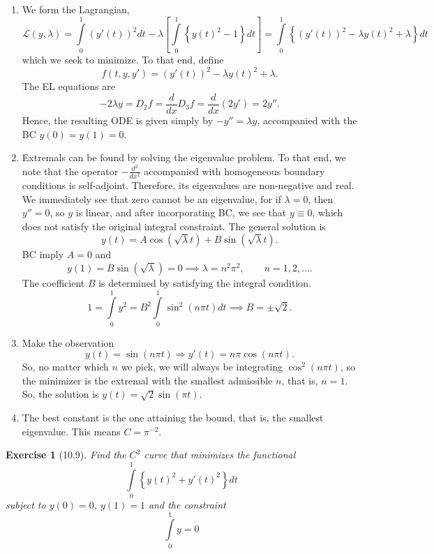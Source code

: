 \documentclass[letterpaper,twoside,11pt]{article}
\theoremstyle{mystyle}
\newtheorem*{exercise}{Exercise}
\newcommand{\cbk}{\color{black}}
\begin{document}
\begin{enumerate}
  \item We form the Lagrangian, 
  \[\mathcal{L}\left( {y,\lambda } \right) = \int\limits_0^1 {{{\left( {y'\left( t \right)} \right)}^2}dt}  - \lambda \left[ {\int\limits_0^1 {\left\{ {y{{\left( t \right)}^2} - 1} \right\}dt} } \right] = \int\limits_0^1 {\left\{ {{{\left( {y'\left( t \right)} \right)}^2} - \lambda y{{\left( t \right)}^2} + \lambda } \right\}dt} \]
  which we seek to minimize. To that end, define 
  \[f(t, y, y') = {{{\left( {y'\left( t \right)} \right)}^2} - \lambda y{{\left( t \right)}^2} + \lambda }.\]
  The EL equations are
  \[ - 2\lambda y = {D_2}f = \frac{d}{{dx}}{D_3}f = \frac{d}{{dx}}\left( {2y'} \right) = 2y''.\]
  Hence, the resulting ODE is given simply by $-y'' = \lambda y$, accompanied with the BC $y(0) = y(1) = 0$. 
  \item Extremals can be found by solving the eigenvalue problem. To that end, we note that the operator $-\frac{d^2}{dx^2}$ accompanied with homogeneous boundary conditions is self-adjoint. Therefore, its eigenvalues are non-negative and real. We immediately see that zero cannot be an eigenvalue, for if $\lambda = 0$, then $y'' = 0$, so $y$ is linear, and after incorporating BC, we see that $y \equiv 0$, which does not satisfy the original integral constraint. The general solution is  
  \[y\left( t \right) = A\cos \left( {\sqrt \lambda  t} \right) + B\sin \left( {\sqrt \lambda  t} \right).\]
  BC imply $A = 0$ and 
  \[y\left( 1 \right) = B\sin \left( {\sqrt \lambda  } \right) = 0 \implies \lambda  = {n^2}{\pi ^2},\qquad n =1, 2, \dots .\]
  The coefficient $B$ is determined by satisfying the integral condition.
  \[1 = \int\limits_0^1 {{y^2}}  = {B^2}\int\limits_0^1 {{{\sin }^2}\left( {n\pi t} \right)dt}  \implies  B =  \pm \sqrt 2 .\]
  \item Make the observation 
  \[y\left( t \right) = \sin \left( {n\pi t} \right) \Rightarrow y'\left( t \right) = n\pi \cos \left( {n\pi t} \right).\]
  So, no matter which $n$ we pick, we will always be integrating $\cos^2(n\pi t)$, so the minimizer is the extremal with the smallest admissible $n$, that is, $n = 1$. So, the solution is $y(t) = \sqrt{2} \sin(\pi t)$. 
  \item The best constant is the one attaining the bound, that is, the smallest eigenvalue. This means $C = \pi^{-2}$. 
\end{enumerate}



\cbk 





\begin{exercise}[10.9]
  Find the $C^2$ curve that minimizes the functional 
  \[\int\limits_0^1 \left\{ y(t)^2 + y'(t)^2 \right\}dt \]
  subject to $y(0) = 0$, $y(1) = 1$ and the constraint 
  \[\int\limits_0^1 y = 0\]
\end{exercise}
\end{document}
